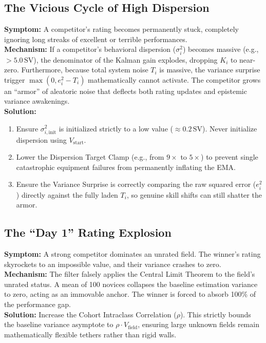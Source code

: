 \documentclass[12pt]{article}
\begin{document}
	\subsection{The Vicious Cycle of High Dispersion}
	\textbf{Symptom:} A competitor's rating becomes permanently stuck, completely ignoring long streaks of excellent or terrible performances.\\
	\textbf{Mechanism:} If a competitor's behavioral dispersion ($\sigma_i^2$) becomes massive (e.g., $> 5.0\,\text{SV}$), the denominator of the Kalman gain explodes, dropping $K_i$ to near-zero. Furthermore, because total system noise $T_i$ is massive, the variance surprise trigger $\max(0, e_i^2 - T_i)$ mathematically cannot activate. The competitor grows an ``armor'' of aleatoric noise that deflects both rating updates and epistemic variance awakenings.\\
	\textbf{Solution:} 
	\begin{enumerate}
		\item Ensure $\sigma_{i,\mathrm{init}}^2$ is initialized strictly to a low value ($\approx 0.2\,\text{SV}$). Never initialize dispersion using $V_{\mathrm{start}}$.
		\item Lower the Dispersion Target Clamp (e.g., from $9\times$ to $5\times$) to prevent single catastrophic equipment failures from permanently inflating the EMA.
		\item Ensure the Variance Surprise is correctly comparing the raw squared error ($e_i^2$) directly against the fully laden $T_i$, so genuine skill shifts can still shatter the armor.
	\end{enumerate}
	
	\subsection{The ``Day 1'' Rating Explosion}
	\textbf{Symptom:} A strong competitor dominates an unrated field. The winner's rating skyrockets to an impossible value, and their variance crashes to zero.\\
	\textbf{Mechanism:} The filter falsely applies the Central Limit Theorem to the field's unrated status. A mean of 100 novices collapses the baseline estimation variance to zero, acting as an immovable anchor. The winner is forced to absorb 100\% of the performance gap.\\
	\textbf{Solution:} Increase the Cohort Intraclass Correlation ($\rho$). This strictly bounds the baseline variance asymptote to $\rho \cdot V_{\mathrm{field}}$, ensuring large unknown fields remain mathematically flexible tethers rather than rigid walls.
	
\end{document}
